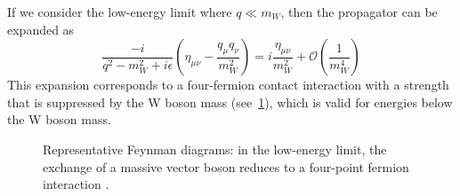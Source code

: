 If we consider the low-energy limit where $q \ll m_W$, then the propagator can
be expanded as
\begin{equation}
  \frac{-i}{q^2 - m_W^2 + i\epsilon} \left( \eta_{\mu\nu} - \frac{q_\mu
  q_\nu}{m_W^2} \right)
  = i \frac{\eta_{\mu\nu}}{m_W^2}
  + \mathcal{O} \left(\frac{1}{m_W^4}\right)
\end{equation}
This expansion corresponds to a four-fermion contact interaction with a strength
that is suppressed by the W boson mass (see~\cref{fig:fermi}), which is valid
for energies below the W boson mass.

\begin{figure}[tb]
  
  \caption[Example Feynman diagrams for Fermi theory]{Representative Feynman
    diagrams: in the low-energy limit, the exchange of a massive vector boson
     reduces to a four-point fermion interaction
    .
  }
  \label{fig:fermi}
\end{figure}

